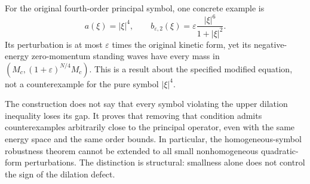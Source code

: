 For the original fourth-order principal symbol, one concrete example is
\[
 a(\xi)=|\xi|^4,\qquad
 b_{\varepsilon,2}(\xi)=\varepsilon\frac{|\xi|^6}{1+|\xi|^2}.
\]
Its perturbation is at most $\varepsilon$ times the original kinetic
form, yet its negative-energy zero-momentum standing waves have every
mass in $(M_c,(1+\varepsilon)^{N/4}M_c)$. This is a result about the
specified modified equation, not a counterexample for the pure symbol
$|\xi|^4$.

The construction does not say that every symbol violating the upper
dilation inequality loses its gap. It proves that removing that
condition admits counterexamples arbitrarily close to the principal
operator, even with the same energy space and the same order bounds.
In particular, the homogeneous-symbol robustness theorem cannot be
extended to all small nonhomogeneous quadratic-form perturbations.
The distinction is structural: smallness alone does not control the
sign of the dilation defect.

